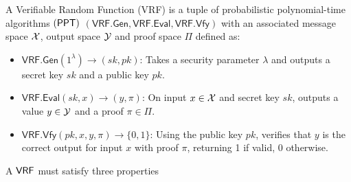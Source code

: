 \begin{definition}
A Verifiable Random Function (VRF) is a tuple of probabilistic polynomial-time algorithms $(\mathsf{PPT})$ $(\mathsf{VRF.Gen}, \mathsf{VRF.Eval}, \mathsf{VRF.Vfy})$ with an associated message space $\mathcal{X}$, output space $\mathcal{Y}$ and proof space $\Pi$ defined as:
\begin{itemize}
    \item $\mathsf{VRF.Gen}(1^\lambda) \to (sk, pk)$: Takes a security parameter $\lambda$ and outputs a secret key $sk$ and a public key $pk$.
    
    \item $\mathsf{VRF.Eval}(sk, x) \to (y, \pi)$: On input $x \in \mathcal{X}$ and secret key $sk$, outputs a value $y \in \mathcal{Y}$ and a proof $\pi \in \Pi$.
    
    \item $\mathsf{VRF.Vfy}(pk, x, y, \pi) \to \{0,1\}$: Using the public key $pk$, verifies that $y$ is the correct output for input $x$ with proof $\pi$, returning 1 if valid, 0 otherwise.
\end{itemize}
    
\end{definition}
A $\mathsf{VRF}$ must satisfy three properties

